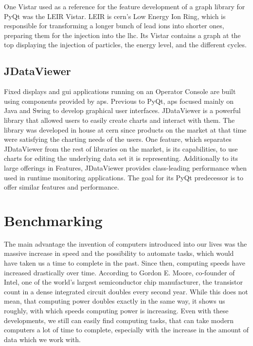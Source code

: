 One Vistar used as a reference for the feature development of a graph library for
PyQt was the LEIR Vistar. LEIR is \gls{cern}'s Low Energy Ion Ring, which is
responsible for transforming a longer bunch of lead ions into shorter ones,
preparing them for the injection into the \gls{lhc}. Its Vistar contains a graph
at the top displaying the injection of particles, the energy level, and the
different cycles.
\cite{Leir}





\subsection{JDataViewer}
\label{sec:fundamentals:cerncharting:jdataviewer}

Fixed displays and \gls{gui} applications running on an Operator Console are
built using components provided by \gls{aps}. Previous to PyQt, \gls{aps}
focused mainly on Java and Swing to develop graphical user interfaces.
JDataViewer is a powerful library that allowed users to easily create charts and
interact with them. The library was developed in house at \gls{cern} since
products on the market at that time were satisfying the charting needs of the
users. One feature, which separates JDataViewer from the rest of libraries on
the market, is its capabilities, to use charts for editing the underlying data
set it is representing. Additionally to its large offerings in Features,
JDataViewer provides class-leading performance when used in runtime monitoring
applications. The goal for its PyQt predecessor is to offer similar features and
performance.
\cite{JDataViewer}



\section{Benchmarking}
\label{sec:fundamentals:benchmarking}

The main advantage the invention of computers introduced into our lives was the
massive increase in speed and the possibility to automate tasks, which would
have taken us a time to complete in the past. Since then, computing speeds have
increased drastically over time. According to Gordon E. Moore, co-founder of
Intel, one of the world's largest semiconductor chip manufacturer, the
transistor count in a dense integrated circuit doubles every second year. While
this does not mean, that computing power doubles exactly in the same way, it
shows us roughly, with which speeds computing power is increasing. Even with
these developments, we still can easily find computing tasks, that can take
modern computers a lot of time to complete, especially with the increase in the
amount of data which we work with.

